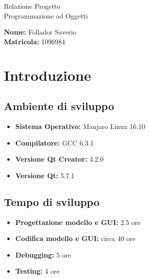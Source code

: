 \documentclass[a4paper,10pt] {article}
\begin{document}
\begin{center}

\begin{Huge} Relazione Progetto \\ Programmazione ad Oggetti \end{Huge}

\vfill

\begin{Large} \textbf{Nome:} Follador Saverio \\ \textbf{Matricola:} 1096984 \end{Large}

\end{center}

\newpage

\tableofcontents

\newpage

\section{Introduzione}

\subsection{Ambiente di sviluppo}
\begin{itemize}
	\item \textbf{Sistema Operativo:} Manjaro Linux 16.10
	\item \textbf{Compilatore:} GCC 6.3.1
	\item \textbf{Versione Qt Creator:} 4.2.0
	\item \textbf{Versione Qt:} 5.7.1
\end{itemize}

\subsection{Tempo di sviluppo}
\begin{itemize}
	\item \textbf{Progettazione modello e GUI:} 2.5 ore
	\item \textbf{Codifica modello e GUI:} circa 40 ore
	\item \textbf{Debugging:} 5 ore
	\item \textbf{Testing:} 4 ore
\end{itemize}
\end{document}
